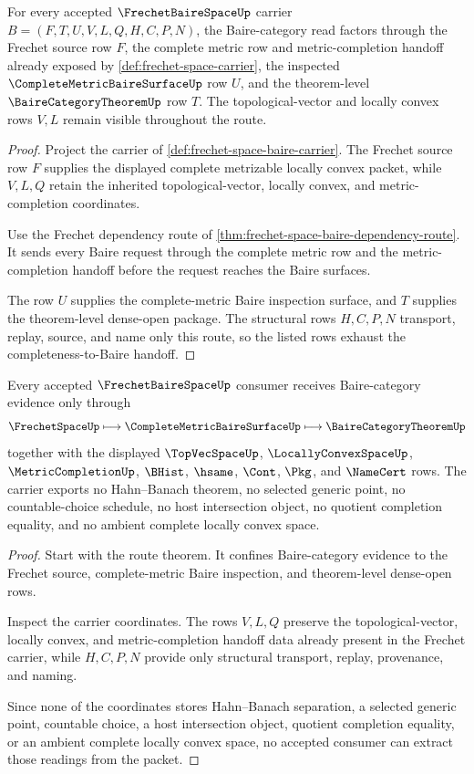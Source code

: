\begin{theorem}
\label{thm:frechet-space-baire-completeness-route}
For every accepted $\FrechetBaireSpaceUp$ carrier $B=(F,T,U,V,L,Q,H,C,P,N)$, the Baire-category read factors through the Frechet source row $F$, the complete metric row and metric-completion handoff already exposed by \autoref{def:frechet-space-carrier}, the inspected $\CompleteMetricBaireSurfaceUp$ row $U$, and the theorem-level $\BaireCategoryTheoremUp$ row $T$. The topological-vector and locally convex rows $V,L$ remain visible throughout the route.
\end{theorem}
\begin{proof}
Project the carrier of \autoref{def:frechet-space-baire-carrier}. The Frechet source row $F$ supplies the displayed complete metrizable locally convex packet, while $V,L,Q$ retain the inherited topological-vector, locally convex, and metric-completion coordinates.

Use the Frechet dependency route of \autoref{thm:frechet-space-baire-dependency-route}. It sends every Baire request through the complete metric row and the metric-completion handoff before the request reaches the Baire surfaces.

The row $U$ supplies the complete-metric Baire inspection surface, and $T$ supplies the theorem-level dense-open package. The structural rows $H,C,P,N$ transport, replay, source, and name only this route, so the listed rows exhaust the completeness-to-Baire handoff.
\end{proof}

\begin{theorem}
\label{thm:frechet-space-baire-nonescape}
Every accepted $\FrechetBaireSpaceUp$ consumer receives Baire-category evidence only through
$$
\FrechetSpaceUp \longmapsto \CompleteMetricBaireSurfaceUp \longmapsto \BaireCategoryTheoremUp
$$
together with the displayed $\TopVecSpaceUp$, $\LocallyConvexSpaceUp$, $\MetricCompletionUp$, $\BHist$, $\hsame$, $\Cont$, $\Pkg$, and $\NameCert$ rows. The carrier exports no Hahn--Banach theorem, no selected generic point, no countable-choice schedule, no host intersection object, no quotient completion equality, and no ambient complete locally convex space.
\end{theorem}
\begin{proof}
Start with the route theorem. It confines Baire-category evidence to the Frechet source, complete-metric Baire inspection, and theorem-level dense-open rows.

Inspect the carrier coordinates. The rows $V,L,Q$ preserve the topological-vector, locally convex, and metric-completion handoff data already present in the Frechet carrier, while $H,C,P,N$ provide only structural transport, replay, provenance, and naming.

Since none of the coordinates stores Hahn--Banach separation, a selected generic point, countable choice, a host intersection object, quotient completion equality, or an ambient complete locally convex space, no accepted consumer can extract those readings from the packet.
\end{proof}

